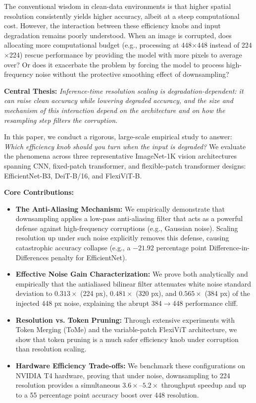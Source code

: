 \documentclass[10pt,twocolumn,letterpaper]{article}
\begin{document}
The conventional wisdom in clean-data environments is that higher spatial resolution consistently yields higher accuracy, albeit at a steep computational cost. However, the interaction between these efficiency knobs and input degradation remains poorly understood. When an image is corrupted, does allocating more computational budget (e.g., processing at 448$\times$448 instead of 224$\times$224) rescue performance by providing the model with more pixels to average over? Or does it exacerbate the problem by forcing the model to process high-frequency noise without the protective smoothing effect of downsampling?

\textbf{Central Thesis:} \textit{Inference-time resolution scaling is degradation-dependent: it can raise clean accuracy while lowering degraded accuracy, and the size and mechanism of this interaction depend on the architecture and on how the resampling step filters the corruption.}

In this paper, we conduct a rigorous, large-scale empirical study to answer: \textit{Which efficiency knob should you turn when the input is degraded?} We evaluate the phenomena across three representative ImageNet-1K vision architectures spanning CNN, fixed-patch transformer, and flexible-patch transformer designs: EfficientNet-B3, DeiT-B/16, and FlexiViT-B.



\textbf{Core Contributions:}
\begin{itemize}
    \item \textbf{The Anti-Aliasing Mechanism:} We empirically demonstrate that downsampling applies a low-pass anti-aliasing filter that acts as a powerful defense against high-frequency corruptions (e.g., Gaussian noise). Scaling resolution up under such noise explicitly removes this defense, causing catastrophic accuracy collapse (e.g., a $-21.92$ percentage point Difference-in-Differences penalty for EfficientNet).
    \item \textbf{Effective Noise Gain Characterization:} We prove both analytically and empirically that the antialiased bilinear filter attenuates white noise standard deviation to $0.313\times$ (224 px), $0.481\times$ (320 px), and $0.565\times$ (384 px) of the injected 448 px noise, explaining the abrupt 384$\to$448 performance cliff.
    \item \textbf{Resolution vs. Token Pruning:} Through extensive experiments with Token Merging (ToMe) and the variable-patch FlexiViT architecture, we show that token pruning is a much safer efficiency knob under corruption than resolution scaling.
    \item \textbf{Hardware Efficiency Trade-offs:} We benchmark these configurations on NVIDIA T4 hardware, proving that under noise, downsampling to 224 resolution provides a simultaneous $3.6\times$--$5.2\times$ throughput speedup and up to a 55 percentage point accuracy boost over 448 resolution.
\end{itemize}
\end{document}
